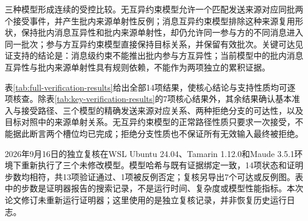 

三种模型形成连续的受控比较。无互异约束模型允许一个匹配发送来源对应同批两个接受事件，并产生批内来源单射性反例；消息互异约束模型排除这种来源复用形状，保持批内消息互异性和批内来源单射性，却仍允许同一参与方的不同消息进入同一批次；参与方互异约束模型直接保持目标关系，并保留有效批次。关键可达见证支持的结论是：消息级约束不能推出批内参与方互异性；当前模型中的批内消息互异性与批内来源单射性具有规则依赖，不能作为两项独立的累积证据。

表\ref{tab:full-verification-results}给出全部14项结果，使核心结论与支持性质均可逐项核查。除表\ref{tab:key-verification-results}的7项核心结果外，其余结果确认基本准入与接受路径、三个模型的精确发送来源对应关系、两种拒绝分支的可达性，以及目标对照中的来源单射关系。无互异约束模型的正常路径性质只要求一次接受，不能据此断言两个槽位均已完成；拒绝分支性质也不保证所有无效输入最终被拒绝。



2026年9月16日的独立复核在WSL Ubuntu 24.04、Tamarin 1.12.0和Maude 3.5.1环境下重新执行了三个未修改模型。模型哈希与既有证据绑定一致，14项状态和证明步数均相符，共13项验证通过、1项被反例否定；复核另导出7个可达或反例图。表中的步数是证明器报告的搜索记录，不是运行时间、复杂度或模型性能指标。本次论文修订未重新运行证明器；这里使用的是独立复核记录，并非恢复历史运行日志。

